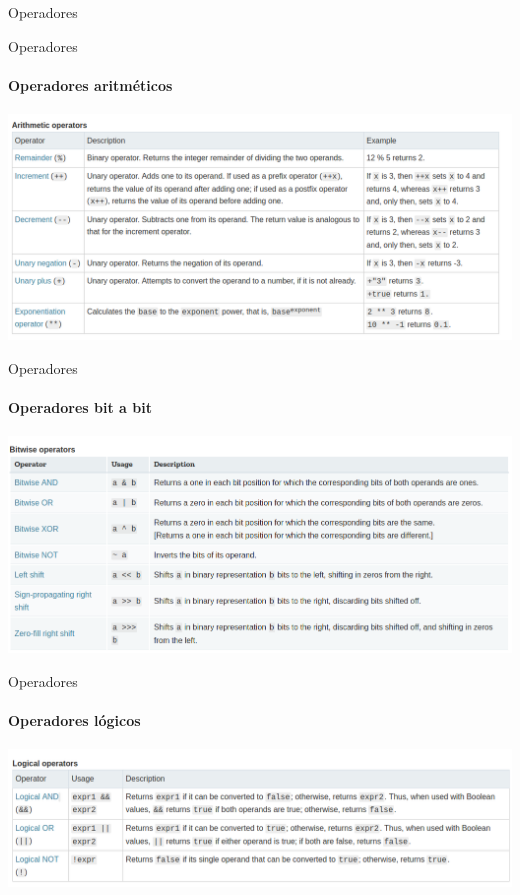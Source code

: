\documentclass[aspectratio=169]{beamer}
\begin{document}
\begin{darkframes}
\begin{frame}{Operadores}
    \end{frame}

    \begin{frame}{Operadores}
      \framesubtitle{Operadores aritméticos}
      \begin{center}
        \includegraphics[width=.8\textwidth]{aritmeticos}
      \end{center}

    \end{frame}

    \begin{frame}{Operadores}
      \framesubtitle{Operadores bit a bit}
      \begin{center}
        \includegraphics[width=.8\textwidth]{bitwise}
      \end{center}

    \end{frame}

    \begin{frame}{Operadores}
      \framesubtitle{Operadores lógicos}
      \begin{center}
        \includegraphics[width=.9\textwidth]{logical}
      \end{center}


\end{frame}
\end{darkframes}
\end{document}
